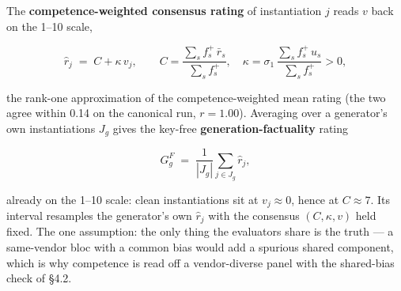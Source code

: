 \documentclass{article}
\begin{document}
The \textbf{competence-weighted consensus rating} of instantiation \(j\) reads \(v\) back on the 1--10 scale,

\[ \hat r_j \;=\; C+\kappa\,v_j,\qquad C=\frac{\sum_s f^{+}_s\,\bar r_s}{\sum_s f^{+}_s},\quad \kappa=\sigma_1\,\frac{\sum_s f^{+}_s\,u_s}{\sum_s f^{+}_s}>0, \tag{A8}\]

the rank-one approximation of the competence-weighted mean rating (the two agree within 0.14 on the canonical run, \(r = 1.00\)). Averaging over a generator's own instantiations \(J_g\) gives the key-free \textbf{generation-factuality} rating

\[ G^{F}_{g} \;=\; \frac1{|J_g|}\sum_{j\in J_g}\hat r_j, \tag{A9}\]

already on the 1--10 scale: clean instantiations sit at \(v_j\approx0\), hence at \(C\approx7\). Its interval resamples the generator's own \(\hat r_j\) with the consensus \((C,\kappa,v)\) held fixed. The one assumption: the only thing the evaluators share is the truth --- a same-vendor bloc with a common bias would add a spurious shared component, which is why competence is read off a vendor-diverse panel with the shared-bias check of \S{}4.2.
\end{document}
